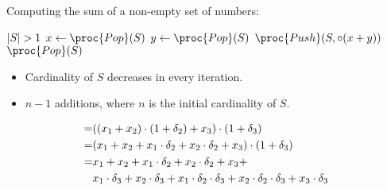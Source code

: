 \begin{frame}

Computing the sum of a non-empty set of numbers:

\begin{codebox}
\li \While ${ \mathopen{} \left| {S} \right| \mathclose{} }>1$ \Do
\li   $x\gets \proc{Pop}(S)$
\li   $y\gets \proc{Pop}(S)$
\li   $\proc{Push}(S, \circ\p{x+y})$
\End
\li \Return $\proc{Pop}(S)$
\end{codebox}

\begin{itemize}

\item Cardinality of $S$ decreases in every iteration.

\item $n-1$ additions, where $n$ is the initial cardinality of $S$.

\end{itemize}

\end{frame}


\begin{frame}

\begin{align}
= & \p{\p{x_1 + x_2} \cdot \p{1 + \delta_2} + x_3} %
      \cdot \p{1 + \delta_3} \\
= & \p{x_1 + x_2 + x_1 \cdot \delta_2 + x_2 \cdot \delta_2 + x_3} %
      \cdot \p{1 + \delta_3} \\
= & x_1 + x_2 + x_1 \cdot \delta_2 + x_2 \cdot \delta_2 + x_3 + \\
  & x_1 \cdot \delta_3 + x_2 \cdot \delta_3 + %
        x_1 \cdot \delta_2 \cdot \delta_3 + %
        x_2 \cdot \delta_2 \cdot \delta_3 +
        x_3 \cdot \delta_3 %
\end{align}

\end{frame}
